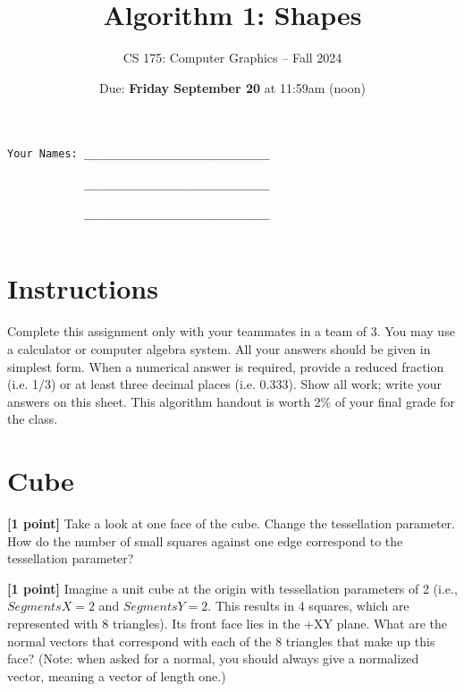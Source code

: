 \documentclass[10pt,twocolumn]{article}
\title{\Huge{\bf Algorithm 1: Shapes}}
\author{CS 175: Computer Graphics -- Fall 2024}
\date{Due:  {\bf Friday September 20} at 11:59am (noon)}                                           %
\begin{document}
\maketitle

\begin{verbatim}
Your Names: _____________________________

            _____________________________

            _____________________________
            
            \end{verbatim}

\section{Instructions}
Complete this assignment only with your teammates in a team of 3. You may use a
calculator or computer algebra system. All your answers should be given in simplest form.
When a numerical answer is required, provide a reduced fraction (i.e. 1/3) or at least three
decimal places (i.e. 0.333). Show all work; write your answers on this sheet. This algorithm handout is worth 2\% of your final grade for the class.


\section{Cube}
 {\bf [1 point]} Take a look at one face of the cube. Change the tessellation parameter. How do the number of small squares against one edge correspond to the tessellation parameter?
\begin{framed}
\vspace{6em}
\end{framed}
{\bf [1 point]} Imagine a unit cube at the origin with tessellation parameters of 2 (i.e., $SegmentsX=2$ and $SegmentsY=2$. This results in 4 squares, which are represented with 8 triangles). Its front face lies in the +XY plane. What are the normal vectors that correspond with each of the 8 triangles that make up this face? (Note: when asked for a normal, you should always give a normalized vector, meaning a vector of length one.)
\begin{framed}
\vspace{6em}
\end{framed}
\end{document}
